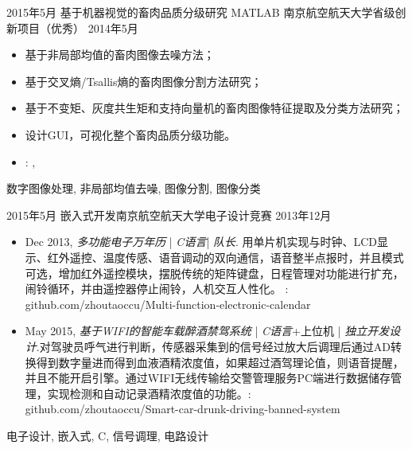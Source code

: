 \begin{experiences}
  \emptySeparator
  \experience
    {2015年5月}   {基于机器视觉的畜肉品质分级研究 MATLAB}{ 南京航空航天大学}{省级创新项目（优秀）}
    {2014年5月} {
                      \begin{itemize}
                        \item 基于非局部均值的畜肉图像去噪方法；
                        \item 基于交叉熵/Tsallis熵的畜肉图像分割方法研究；
                        \item 基于不变矩、灰度共生矩和支持向量机的畜肉图像特征提取及分类方法研究；
				   \item 设计GUI，可视化整个畜肉品质分级功能。
                        \item \faGithub: , 
                      \end{itemize}
                    }
                    {数字图像处理, 非局部均值去噪, 图像分割, 图像分类}

  \emptySeparator 
  \experience
  {2015年5月} {嵌入式开发}{南京航空航天大学}{电子设计竞赛}
  {2013年12月}    {
				  	\begin{itemize}
				  		\item Dec 2013, \emph{多功能电子万年历} | \emph{C语言}| \emph{队长}. 
				  		用单片机实现与时钟、LCD显示、红外遥控、温度传感、语音调动的双向通信，语音整半点报时，并且模式可选，增加红外遥控模块，摆脱传统的矩阵键盘，日程管理对功能进行扩充，闹铃循环，并由遥控器停止闹铃，人机交互人性化。 \faGithub:  {github.com/zhoutaoccu/Multi-function-electronic-calendar}                                                                      
				  		\item May 2015, \emph{基于WIFI的智能车载醉酒禁驾系统} | \emph{C语言}+上位机 | \emph{独立开发设计}.对驾驶员呼气进行判断，传感器采集到的信号经过放大后调理后通过AD转换得到数字量进而得到血液酒精浓度值，如果超过酒驾理论值，则语音提醒，并且不能开启引擎。通过WIFI无线传输给交警管理服务PC端进行数据储存管理，实现检测和自动记录酒精浓度值的功能。\faGithub:  {github.com/zhoutaoccu/Smart-car-drunk-driving-banned-system}
				  	\end{itemize}
				  }
				  {电子设计, 嵌入式, C, 信号调理, 电路设计}
		
\end{experiences}
